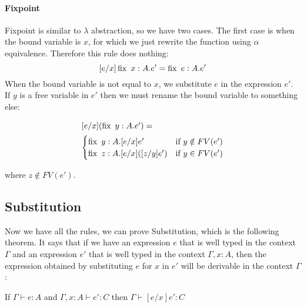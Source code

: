 \paragraph{Fixpoint} Fixpoint is similar to $\lambda$ abstraction, so we have two cases. The first case is when the bound variable is $x$, for which we just rewrite the function using $\alpha$ equivalence. Therefore this rule does nothing:
\[ [e/x] \operatorname{fix} \ x:A. e' = \operatorname{fix} \ e:A. e'\]
When the bound variable is not equal to $x$, we substitute $e$ in the expression $e'$. If $y$ is a free variable in $e'$ then we must rename the bound variable to something else:

\begin{minipage}{4in}
\begin{align*}
\intertext{$[e/x](\operatorname{fix} \ y:A.e')=$}
  \begin{cases}
            \operatorname{fix} \ y:A. [e/x]e' & \text{if } y \notin FV(e')  \\
           \operatorname{fix} \ z:A. [e/x]([z/y]e') & \text{if } y \in FV(e')
  \end{cases}
\end{align*} 
\end{minipage}

where $z \notin FV(e')$.

\subsection{Substitution}

Now we have all the rules, we can prove Substitution, which is the following theorem. It says that if we have an expression $e$ that is well typed in the context $\Gamma$ and an expression $e'$ that is well typed in the context $\Gamma,x:A$, then the expression obtained by substituting $e$ for $x$ in $e'$ will be derivable in the context $\Gamma$:

\vspace{0.5cm}

\begin{thm}If $\Gamma \vdash e:A$ and $\Gamma, x:A \vdash e' : C$ then $\Gamma \vdash [e/x] e' : C$ \end{thm}


